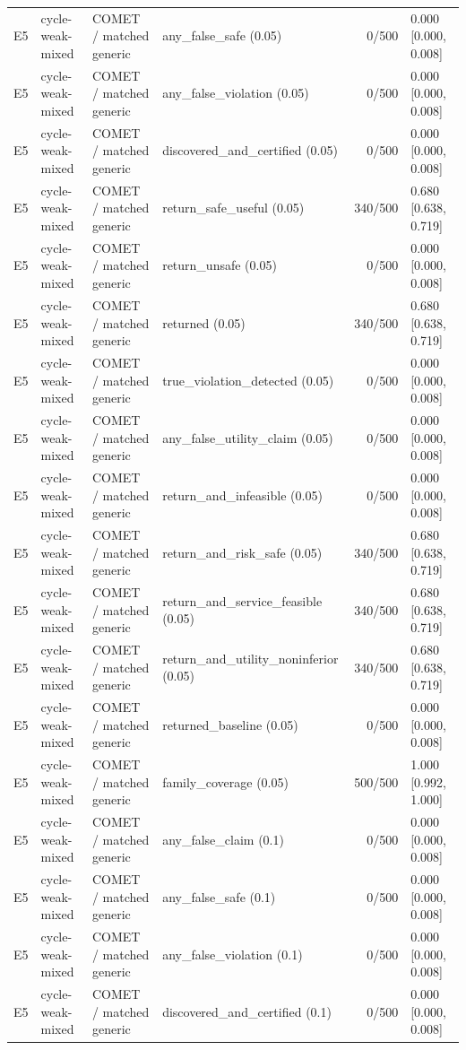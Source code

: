 \begin{longtable}{p{.04\linewidth}p{.18\linewidth}p{.19\linewidth}p{.16\linewidth}r p{.21\linewidth}}
E5 & cycle-weak-mixed & COMET / matched generic & any\_false\_safe (0.05) & 0/500 & 0.000 [0.000, 0.008]\\
E5 & cycle-weak-mixed & COMET / matched generic & any\_false\_violation (0.05) & 0/500 & 0.000 [0.000, 0.008]\\
E5 & cycle-weak-mixed & COMET / matched generic & discovered\_and\_certified (0.05) & 0/500 & 0.000 [0.000, 0.008]\\
E5 & cycle-weak-mixed & COMET / matched generic & return\_safe\_useful (0.05) & 340/500 & 0.680 [0.638, 0.719]\\
E5 & cycle-weak-mixed & COMET / matched generic & return\_unsafe (0.05) & 0/500 & 0.000 [0.000, 0.008]\\
E5 & cycle-weak-mixed & COMET / matched generic & returned (0.05) & 340/500 & 0.680 [0.638, 0.719]\\
E5 & cycle-weak-mixed & COMET / matched generic & true\_violation\_detected (0.05) & 0/500 & 0.000 [0.000, 0.008]\\
E5 & cycle-weak-mixed & COMET / matched generic & any\_false\_utility\_claim (0.05) & 0/500 & 0.000 [0.000, 0.008]\\
E5 & cycle-weak-mixed & COMET / matched generic & return\_and\_infeasible (0.05) & 0/500 & 0.000 [0.000, 0.008]\\
E5 & cycle-weak-mixed & COMET / matched generic & return\_and\_risk\_safe (0.05) & 340/500 & 0.680 [0.638, 0.719]\\
E5 & cycle-weak-mixed & COMET / matched generic & return\_and\_service\_feasible (0.05) & 340/500 & 0.680 [0.638, 0.719]\\
E5 & cycle-weak-mixed & COMET / matched generic & return\_and\_utility\_noninferior (0.05) & 340/500 & 0.680 [0.638, 0.719]\\
E5 & cycle-weak-mixed & COMET / matched generic & returned\_baseline (0.05) & 0/500 & 0.000 [0.000, 0.008]\\
E5 & cycle-weak-mixed & COMET / matched generic & family\_coverage (0.05) & 500/500 & 1.000 [0.992, 1.000]\\
E5 & cycle-weak-mixed & COMET / matched generic & any\_false\_claim (0.1) & 0/500 & 0.000 [0.000, 0.008]\\
E5 & cycle-weak-mixed & COMET / matched generic & any\_false\_safe (0.1) & 0/500 & 0.000 [0.000, 0.008]\\
E5 & cycle-weak-mixed & COMET / matched generic & any\_false\_violation (0.1) & 0/500 & 0.000 [0.000, 0.008]\\
E5 & cycle-weak-mixed & COMET / matched generic & discovered\_and\_certified (0.1) & 0/500 & 0.000 [0.000, 0.008]\\

\end{longtable}
